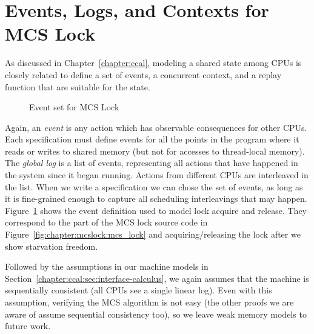 \section{Events, Logs, and  Contexts for MCS Lock}
\label{chapter:mcslock:sec:eventlogandoracle}

As discussed in Chapter~\ref{chapter:ccal}, 
modeling a shared state among CPUs is 
closely related to define a set of events, a concurrent context, and a replay function that are suitable for
the state.


\begin{figure}
\begin{minipage}{\linewidth}

\end{minipage}
\caption{Event set for MCS Lock}
\label{fig:chapter:mcslock:lock_event_type}
\end{figure}

Again, an \emph{event} is any action which has observable consequences for
other CPUs. Each specification must define events for all the points
in the program where it reads or writes to shared memory (but not for
accesses to thread-local memory). The \emph{global log} is a list of
events, representing all actions that have happened in the system
since it began running. Actions from different CPUs are interleaved in
the list.
When we write a specification we can chose the set of events, as long
as it is fine-grained enough to capture all scheduling interleavings
that may happen.
Figure~\ref{fig:chapter:mcslock:lock_event_type} shows the event definition used to
model lock acquire and release. They correspond to the part of the MCS lock source code in Figure~\ref{fig:chapter:mcslock:mcs_lock}
and acquiring/releasing the lock after we show starvation freedom. 

Followed by the assumptions in our machine models in Section~\ref{chapter:ccal:sec:interface-calculus},  we again assumes that the
machine is sequentially consistent (all CPUs see a single linear log). Even with this assumption,
verifying the MCS algorithm is not easy (the other proofs we are aware
of assume sequential consistency too), so we leave weak memory models
to future work.

